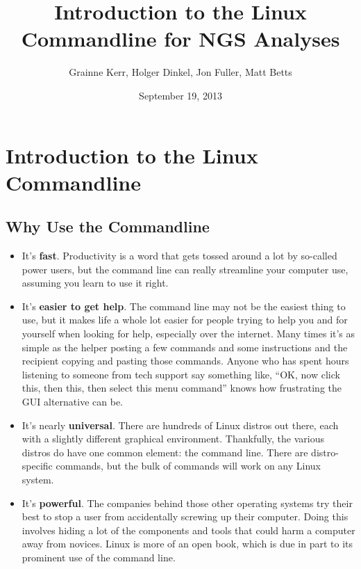 \documentclass[a4paper,11pt,english]{sphinxmanual}
\title{Introduction to the Linux Commandline for NGS Analyses}
\date{September 19, 2013}
\author{Grainne Kerr, Holger Dinkel, Jon Fuller, Matt Betts}
\begin{document}
\maketitle
\tableofcontents
{}\label{index::doc}



\chapter{Introduction to the Linux Commandline}
\label{introduction:introduction-to-the-linux-commandline}\label{introduction:introduction-to-the-linux-commandline-for-ngs-analyses}\label{introduction::doc}

\section{Why Use the Commandline}
\label{introduction:why-use-the-commandline}\begin{itemize}
\item {} 
It's \textbf{fast}. Productivity is a word that gets tossed around a lot by so-called power users, but the command line can really streamline your computer use, assuming you learn to use it right.

\item {} 
It's \textbf{easier to get help}. The command line may not be the easiest thing to use, but it makes life a whole lot easier for people trying to help you and for yourself when looking for help, especially over the internet. Many times it's as simple as the helper posting a few commands and some instructions and the recipient copying and pasting those commands. Anyone who has spent hours listening to someone from tech support say something like, “OK, now click this, then this, then select this menu command” knows how frustrating the GUI alternative can be.

\item {} 
It's nearly \textbf{universal}. There are hundreds of Linux distros out there, each with a slightly different graphical environment. Thankfully, the various distros do have one common element: the command line. There are distro-specific commands, but the bulk of commands will work on any Linux system.

\item {} 
It's \textbf{powerful}. The companies behind those other operating systems try their best to stop a user from accidentally screwing up their computer. Doing this involves hiding a lot of the components and tools that could harm a computer away from novices. Linux is more of an open book, which is due in part to its prominent use of the command line.

\end{itemize}
\end{document}
